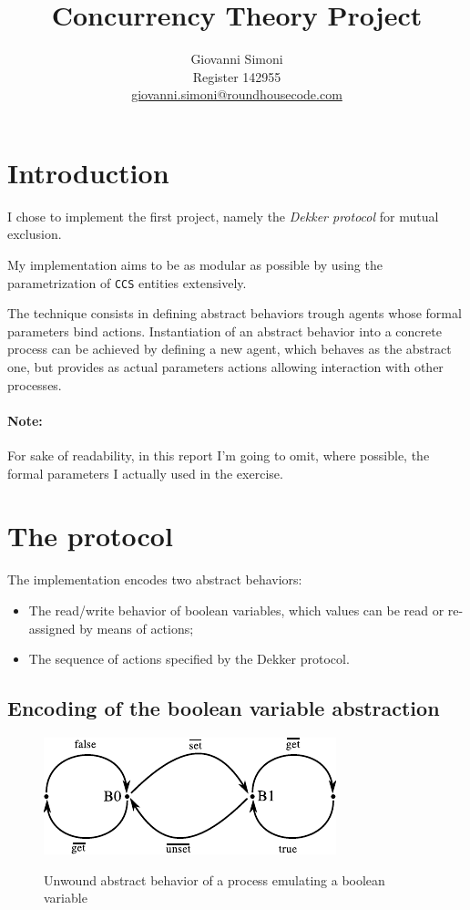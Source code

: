 \documentclass[10pt,a4paper]{article}
\title {
    Concurrency Theory Project
}
\author{
    Giovanni Simoni\\
    Register 142955\\
    \href{mailto:giovanni.simoni@roundhousecode.com}
         {giovanni.simoni@roundhousecode.com}
}
\newcommand{\Note}[1]{\paragraph{Note:}{#1}}
\newcommand{\CCS}{{\tt CCS}}
\begin{document}
\maketitle

\section{Introduction}
\label{sec:Intro}

    I chose to implement the first project, namely the \emph{Dekker
    protocol} for mutual exclusion.

    My implementation aims to be as modular as possible by using the
    parametrization of \CCS{} entities extensively.

    The technique consists in defining abstract behaviors trough agents
    whose formal parameters bind actions. Instantiation of an
    abstract behavior into a concrete process can be achieved by defining
    a new agent, which behaves as the abstract one, but provides as
    actual parameters actions allowing interaction with other
    processes.

    \Note{
        For sake of readability, in this report I'm going to omit, where
        possible, the formal parameters I actually used in the exercise.
    }

\section{The protocol}

    The implementation encodes two abstract behaviors:

    \begin{itemize}

    \item   The read/write behavior of boolean variables, which values can
            be read or re-assigned by means of actions;

    \item   The sequence of actions specified by the Dekker
            protocol.

    \end{itemize}

    \subsection{Encoding of the boolean variable abstraction}
    \label{sub:EncodeBool}

        \begin{figure}[htbp]
            \centering
            \includegraphics[width=.5\textwidth]{pics/bool}
            \label{pic:Bool}
            \caption{
                Unwound abstract behavior of a process emulating a boolean
                variable
            }
        \end{figure}
\end{document}
